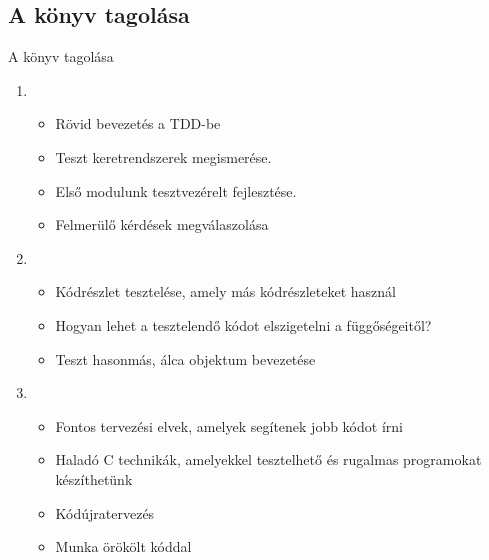 \subsection{A könyv tagolása}

\begin{frame}{A könyv tagolása}
  \begin{enumerate}[<+->]
  \item
    \begin{itemize}
    \item Rövid bevezetés a TDD-be
    \item Teszt keretrendszerek megismerése.
    \item Első modulunk tesztvezérelt fejlesztése.
    \item Felmerülő kérdések megválaszolása
    \end{itemize}

  \item
    \begin{itemize}
    \item Kódrészlet tesztelése, amely más kódrészleteket használ
    \item Hogyan lehet a tesztelendő kódot elszigetelni a függőségeitől?
    \item Teszt hasonmás, álca objektum bevezetése
    \end{itemize}

  \item
    \begin{itemize}
    \item Fontos tervezési elvek, amelyek segítenek jobb kódot írni
    \item Haladó C technikák, amelyekkel tesztelhető és rugalmas programokat készíthetünk
    \item Kódújratervezés
    \item Munka örökölt kóddal
    \end{itemize}
  \end{enumerate}
\end{frame}
